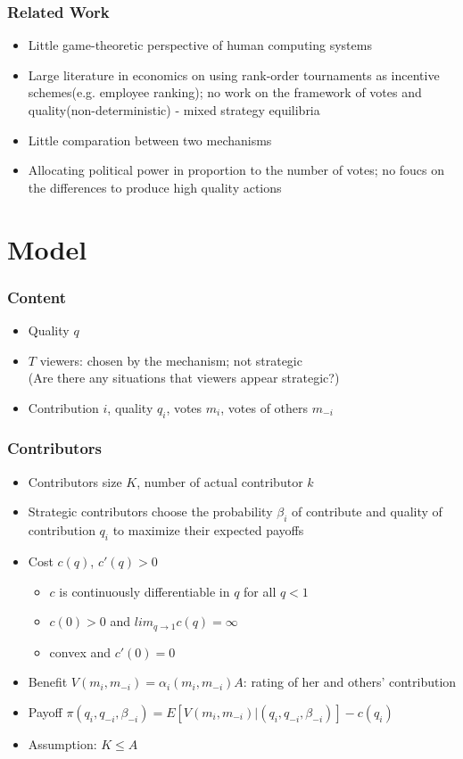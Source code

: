 \documentclass{beamer}
\begin{document}
\begin{frame}
\frametitle{Related Work}
\begin{itemize}
	\item Little game-theoretic perspective of human computing systems
	\item Large literature in economics on using rank-order tournaments as incentive schemes(e.g. employee ranking); no work on the framework of votes and quality(non-deterministic) - mixed strategy equilibria
	\item Little comparation between two mechanisms
	\item Allocating political power in proportion to the number of votes; no foucs on the differences to produce high quality actions 
\end{itemize}
\end{frame}

\section{Model}
\begin{frame}
\frametitle{Content}
\begin{itemize}
\item Quality $q$
\item $T$ viewers: chosen by the mechanism; not strategic \\
(Are there any situations that viewers appear strategic?)
\item Contribution $i$, quality $q_i$, votes $m_i$, votes of others $m_{-i}$
\end{itemize}
\end{frame}

\begin{frame}
\frametitle{Contributors}
\begin{itemize}
	\item Contributors size $K$, number of actual contributor $k$
	\item Strategic contributors choose the probability $\beta_i$ of contribute and quality of contribution $q_i$ to maximize their expected payoffs
	\item Cost $c(q)$, $c'(q)>0$
	\begin{itemize}
		\item $c$ is continuously differentiable in $q$ for all $q<1$
		\item $c(0)>0$ and $lim_{q\to 1}c(q)=\infty$
		\item convex and $c'(0)=0$
	\end{itemize}
	\item Benefit $V(m_i,m_{-i})=\alpha_i(m_i,m_{-i})A$: rating of her and others' contribution 
	\item Payoff $\pi(q_i,q_{-i},\beta_{-i})=E[V(m_i,m_{-i})|(q_i,q_{-i},\beta_{-i})]-c(q_i)$
	\item Assumption: $K\leq A$
\end{itemize}
\end{frame}
\end{document}
